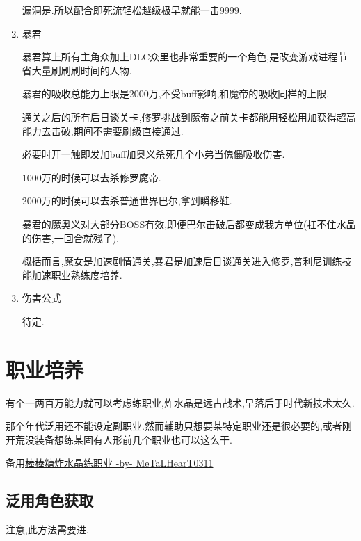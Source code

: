 \begin{enumerate}
	漏洞是{\color{red}{练武5吃即死}}.所以配合即死流轻松越级极早就能一击9999.

	\item{暴君}

	暴君算上所有主角众加上DLC众里也非常重要的一个角色,是改变游戏进程节省大量刷刷刷时间的人物.

	暴君的吸收总能力上限是2000万,不受buff影响,和魔帝的吸收同样的上限.

	通关之后的所有后日谈关卡,修罗挑战到魔帝之前关卡都能用轻松用{\color{red}{即死流}}加{\color{red}{暴君吸收}}获得超高能力去击破,期间不需要刷级直接通过.

	必要时开一触即发加buff加奥义杀死几个小弟当傀儡吸收伤害.

	1000万的时候可以去杀修罗魔帝.

	2000万的时候可以去杀普通世界巴尔,拿到瞬移鞋.

	暴君的魔奥义对大部分BOSS有效,即便巴尔击破后都变成我方单位(扛不住水晶的伤害,一回合就残了).

	概括而言,魔女是加速剧情通关,暴君是加速后日谈通关进入修罗,普利尼训练技能加速职业熟练度培养.


	\item{伤害公式}

	待定.

\end{enumerate}

\newpage


	\section{职业培养}

	有个一两百万能力就可以考虑练职业,炸水晶是远古战术,早落后于时代新技术太久.

	那个年代泛用还不能设定副职业.然而辅助只想要某特定职业还是很必要的,或者刚开荒没装备想练某固有人形前几个职业也可以这么干.

	备用\href{http://tieba.baidu.com/p/3717431968}{棒棒糖炸水晶练职业 -by- MeTaLHearT0311}

		\subsection{泛用角色获取}

		注意,此方法需要进{\color{red}{修罗以后}}.

